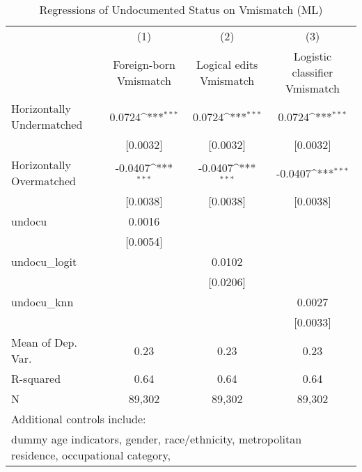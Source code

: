 \begin{table}[htbp]\centering
\def\sym#1{\ifmmode^{#1}\else\(^{#1}\)\fi}
\caption{Regressions of Undocumented Status on Vmismatch (ML)}
\begin{tabular}{l*{3}{c}}
\toprule
                    &\multicolumn{1}{c}{(1)}         &\multicolumn{1}{c}{(2)}         &\multicolumn{1}{c}{(3)}         \\
                    &Foreign-born Vmismatch         &Logical edits Vmismatch         &Logistic classifier Vmismatch         \\
\midrule
Horizontally Undermatched&      0.0724\sym{***}&      0.0724\sym{***}&      0.0724\sym{***}\\
                    &    [0.0032]         &    [0.0032]         &    [0.0032]         \\
\addlinespace
Horizontally Overmatched&     -0.0407\sym{***}&     -0.0407\sym{***}&     -0.0407\sym{***}\\
                    &    [0.0038]         &    [0.0038]         &    [0.0038]         \\
\addlinespace
undocu              &      0.0016         &                     &                     \\
                    &    [0.0054]         &                     &                     \\
\addlinespace
undocu\_logit        &                     &      0.0102         &                     \\
                    &                     &    [0.0206]         &                     \\
\addlinespace
undocu\_knn          &                     &                     &      0.0027         \\
                    &                     &                     &    [0.0033]         \\
\midrule
Mean of Dep. Var.   &        0.23         &        0.23         &        0.23         \\
R-squared           &        0.64         &        0.64         &        0.64         \\
N                   &      89,302         &      89,302         &      89,302         \\
\bottomrule
\multicolumn{4}{l}{\footnotesize Additional controls include:}\\
\multicolumn{4}{l}{\footnotesize dummy age indicators, gender, race/ethnicity, metropolitan residence, occupational category,}\\

\end{tabular}
\end{table}
